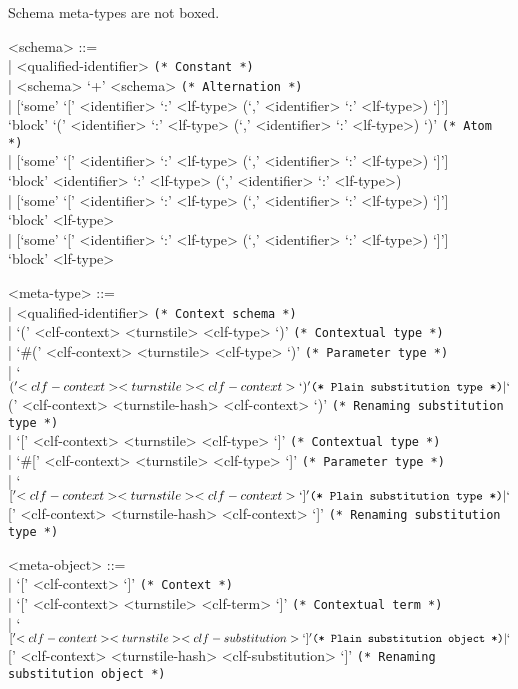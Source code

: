 \documentclass[11pt]{article}
\begin{document}
Schema meta-types are not boxed.

\begin{grammar}
<schema> ::= \hfill\\
| <qualified-identifier> \hfill \texttt{(* Constant *)}\\
| <schema> `+' <schema> \hfill \texttt{(* Alternation *)}\\
| [`some' `[' <identifier> `:' <lf-type> (`,' <identifier> `:' <lf-type>) `]']\\
  `block' `(' <identifier> `:' <lf-type> (`,' <identifier> `:' <lf-type>) `)' \hfill \texttt{(* Atom *)}\\
| [`some' `[' <identifier> `:' <lf-type> (`,' <identifier> `:' <lf-type>) `]']\\
  `block' <identifier> `:' <lf-type> (`,' <identifier> `:' <lf-type>)\\
| [`some' `[' <identifier> `:' <lf-type> (`,' <identifier> `:' <lf-type>) `]']\\
  `block' <lf-type>\\
| [`some' `[' <identifier> `:' <lf-type> (`,' <identifier> `:' <lf-type>) `]']\\
  `block' <lf-type>

<meta-type> ::= \hfill\\
| <qualified-identifier> \hfill \texttt{(* Context schema *)}\\
| `(' <clf-context> <turnstile> <clf-type> `)' \hfill \texttt{(* Contextual type *)}\\
| `#(' <clf-context> <turnstile> <clf-type> `)' \hfill \texttt{(* Parameter type *)}\\
| `$(' <clf-context> <turnstile> <clf-context> `)' \hfill \texttt{(* Plain substitution type *)}\\
| `$(' <clf-context> <turnstile-hash> <clf-context> `)' \hfill \texttt{(* Renaming substitution type *)}\\
| `[' <clf-context> <turnstile> <clf-type> `]' \hfill \texttt{(* Contextual type *)}\\
| `#[' <clf-context> <turnstile> <clf-type> `]' \hfill \texttt{(* Parameter type *)}\\
| `$[' <clf-context> <turnstile> <clf-context> `]' \hfill \texttt{(* Plain substitution type *)}\\
| `$[' <clf-context> <turnstile-hash> <clf-context> `]' \hfill \texttt{(* Renaming substitution type *)}

<meta-object> ::= \hfill\\
| `[' <clf-context> `]' \hfill \texttt{(* Context *)}\\
| `[' <clf-context> <turnstile> <clf-term> `]' \hfill \texttt{(* Contextual term *)}\\
| `$[' <clf-context> <turnstile> <clf-substitution> `]' \hfill \texttt{(* Plain substitution object *)}\\
| `$[' <clf-context> <turnstile-hash> <clf-substitution> `]' \hfill \texttt{(* Renaming substitution object *)}


\end{grammar}
\end{document}
